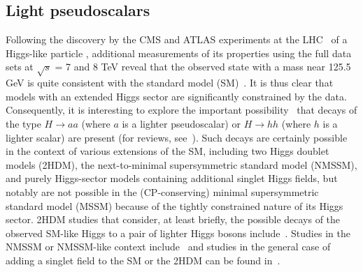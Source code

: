 \subsection{Light pseudoscalars\label{sec:lighta}}
Following the discovery by the CMS and ATLAS experiments at the LHC~\cite{Aad:2012tfa,Chatrchyan:2012ufa} of a Higgs-like particle \PH, additional measurements of its properties using the full data sets at $\sqrt{s}$ = 7 and 8 TeV reveal that the observed state with a mass near 125.5 GeV is quite consistent with the standard model (SM)~\cite{ATLASnew,CMS:new,Aad:2013wqa}. It is thus clear that models with an extended Higgs sector are significantly constrained by the data.  Consequently, it is interesting to explore the important possibility~\cite{Dermisek:2005ar,Dermisek:2006wr} that decays of the type $H$$\rightarrow$$aa$ (where $a$ is a lighter pseudoscalar) or $H$$\rightarrow$$hh$ (where $h$ is a lighter scalar) are present (for reviews, see~\cite{Chang:2008cw,Curtin:2013fra}). Such decays are certainly possible in the context of various extensions of the SM, including two Higgs doublet models (2HDM), the next-to-minimal supersymmetric standard model (NMSSM), and purely Higgs-sector models containing additional singlet Higgs fields, but notably are not possible in the (CP-conserving) minimal supersymmetric standard model (MSSM) because of the tightly constrained nature of its Higgs sector. 2HDM studies that consider, at least briefly, the possible decays of the observed SM-like Higgs to a pair of lighter Higgs bosons include~\cite{Celis:2013rcs,Grinstein:2013npa,Coleppa:2013dya,Chen:2013rba,Craig:2013hca,Wang:2013sha,Curtin:2013fra,Baglio:2014nea}. Studies in the NMSSM or NMSSM-like context include~\cite{King:2012tr,Cao:2013gba,Christensen:2013dra,Cerdeno:2013cz,Curtin:2013fra} and studies in the general case of adding a singlet field to the SM or the 2HDM can be found in~\cite{Chalons:2012qe,Ahriche:2013vqa,Curtin:2013fra}.

